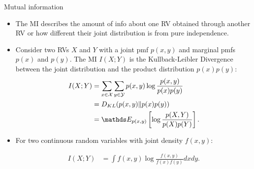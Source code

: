 \documentclass[11pt,compress,t,notes=noshow, xcolor=table]{beamer}
\begin{document}
\begin{vbframe} {Mutual information}

% 

\begin{itemize}
\item The MI describes the amount of info about one RV obtained through another RV or how different their joint distribution is from pure independence.
\item Consider two RVs $X$ and $Y$ with a joint pmf $p(x, y)$ and marginal pmfs $p(x)$ and $p(y)$. The MI $I (X;Y)$ is the Kullback-Leibler Divergence between the joint distribution and the product distribution $p(x)p(y)$:
\footnotesize
\begin{equation*}\begin{aligned}
I(X ; Y) &=\sum_{x \in \Xspace} \sum_{y \in \Yspace} p(x, y) \log \frac{p(x, y)}{p(x) p(y)} \\
&=D_{KL}(p(x, y) \| p(x) p(y)) \\
&=\E_{p(x, y)} \left[ \log \frac{p(X, Y)}{p(X) p(Y)} \right].
\end{aligned}\end{equation*}
\normalsize

\item For two continuous random variables with joint density $f(x,y)$:

\footnotesize
\begin{equation*}\begin{aligned}
I(X ; Y) &= \int f(x,y) \log \frac{f(x,y)}{f(x)f(y)} dx dy.
\end{aligned}
\end{equation*}
\normalsize

\end{itemize}

\end{vbframe}
\end{document}
